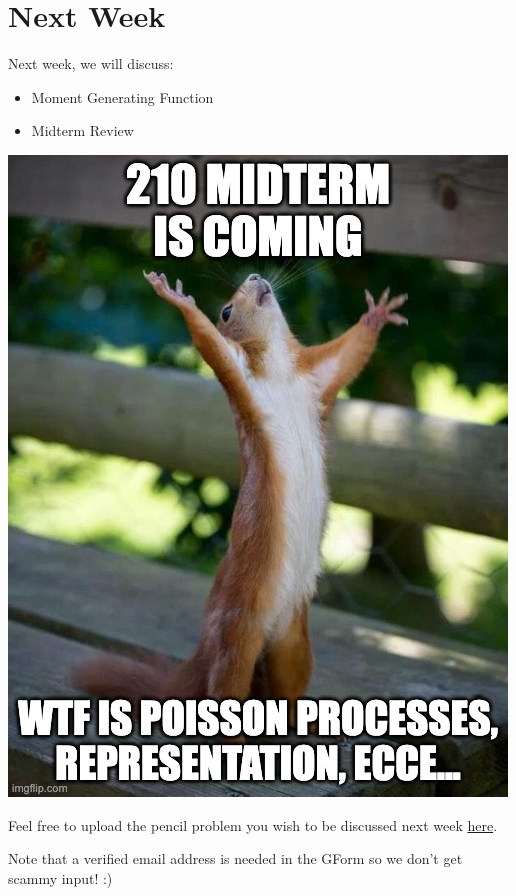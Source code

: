 \documentclass[
  letterpaper,
  DIV=11,
  numbers=noendperiod]{scrreprt}
\providecommand{\tightlist}{%
  \setlength{\itemsep}{0pt}\setlength{\parskip}{0pt}}\usepackage{longtable,booktabs,array}
\theoremstyle{definition}
\theoremstyle{plain}
\theoremstyle{remark}
\begin{document}
\hypertarget{next-week-4}{%
\section*{Next Week}\label{next-week-4}}


Next week, we will discuss:

\begin{itemize}
\tightlist
\item
  Moment Generating Function
\item
  Midterm Review
\end{itemize}

\includegraphics{./assets/img/midterm.jpeg}

Feel free to upload the pencil problem you wish to be discussed next
week \href{https://forms.gle/RBmMNYJp4u3qD5W79}{here}.

Note that a verified email address is needed in the GForm so we don't
get scammy input! :)
\end{document}
